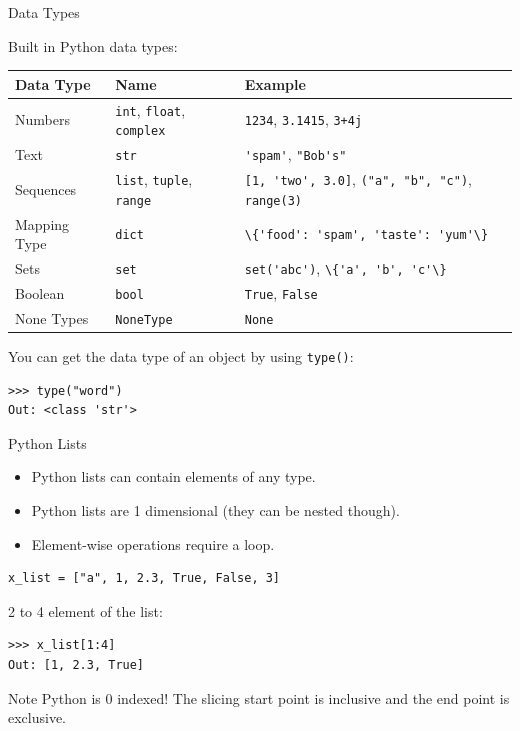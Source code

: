 \documentclass[compress%
,aspectratio=169%
]{beamer}
\newcommand{\code}{\lstinline}
\begin{document}
\begin{frame}[fragile]{Data Types}

Built in Python data types:
\begin{table}
\tiny
\setlength\fboxsep{1.5pt} %
\begin{tabularx}{\textwidth}{llX}
    \toprule
    \textbf{Data Type}  & \textbf{Name}  & \textbf{Example}   \\
    \midrule
    Numbers         &  \code|int|,  \code|float|,  \code|complex| & \code|1234|, \code|3.1415|, \code|3+4j| \\
    Text            &  \code|str|      & \code|'spam'|, \code|"Bob's"|    \\
    Sequences       &  \code|list|,  \code|tuple|,  \code|range|  & \code|[1, 'two', 3.0]|,  \code|("a", "b", "c")|,  \code|range(3)| \\
    Mapping Type    &  \code|dict|     & \code|\{'food': 'spam', 'taste': 'yum'\}|  \\
    Sets            &  \code|set|      & \code|set('abc')|, \code|\{'a', 'b', 'c'\}| \\           
    Boolean         &  \code|bool|     & \code|True|, \code|False|  \\
    None Types      & \code|NoneType|  & \code|None| \\
    \bottomrule
\end{tabularx}
\end{table}

You can get the data type of an object by using \lstinline|type()|:
\begin{lstlisting}
>>> type("word")
Out: <class 'str'>
\end{lstlisting}

\end{frame}


\begin{frame}[fragile]{Python Lists}

\begin{itemize}
    \item Python lists can contain elements of any type.
    \item Python lists are 1 dimensional (they can be nested though).
    \item Element-wise operations require a loop.
\end{itemize}
\begin{lstlisting}
x_list = ["a", 1, 2.3, True, False, 3]
\end{lstlisting}
2 to 4 element of the list:
\begin{lstlisting}
>>> x_list[1:4]
Out: [1, 2.3, True]
\end{lstlisting}
\begin{alertblock}{Note}
Python is 0 indexed! The slicing start point is inclusive and the end point is exclusive.
\end{alertblock}
\end{frame}
\end{document}
